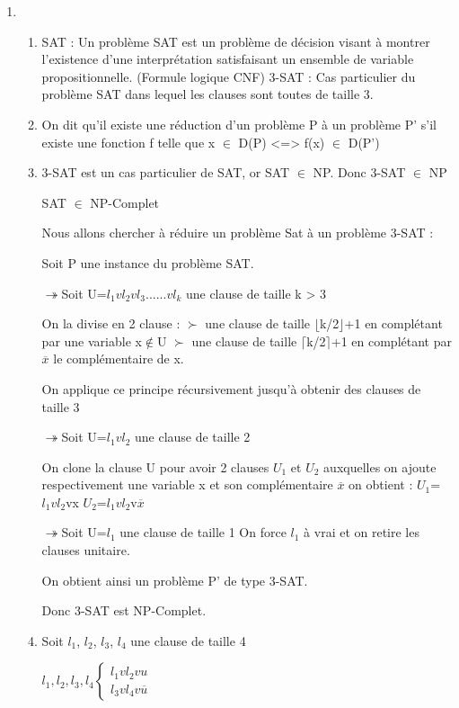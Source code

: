 \documentclass{article}
\begin{document}
\begin{enumerate}
\item \begin{enumerate}
  \item
    SAT : Un  problème SAT est un problème de décision visant à montrer l'existence d'une interprétation satisfaisant un ensemble de variable propositionnelle. (Formule logique CNF)
    3-SAT : Cas particulier du problème SAT dans lequel les clauses sont toutes de taille 3.

  \item
    On dit qu'il existe une réduction d'un problème P à un problème P' s'il existe une fonction f telle que x $\in$ D(P) <=> f(x) $\in$ D(P')

  \item
    3-SAT est un cas particulier de SAT, or SAT $\in$ NP.
    Donc 3-SAT $\in$ NP

    SAT $\in$ NP-Complet

    Nous allons chercher à réduire un problème Sat à un problème 3-SAT : 

    Soit P une instance du problème SAT.
    
    $\twoheadrightarrow$Soit U={$l_1vl_2vl_3......vl_k$} une clause de taille k > 3

    On la divise en 2 clause :
    $\succ$ une clause de taille $\lfloor$k/2$\rfloor$+1 en complétant par une variable x$\notin$U 
    $\succ$ une clause de taille $\lceil$k/2$\rceil$+1 en complétant par $\overline x$ le complémentaire de x.

    On applique ce principe récursivement jusqu'à obtenir des clauses de taille 3

    $\twoheadrightarrow$Soit U={$l_1vl_2$} une clause de taille 2
    
    On clone la clause U pour avoir 2 clauses $U_1$ et $U_2$ auxquelles on ajoute respectivement une variable x et son complémentaire $\overline x$
    on obtient :  $U_1$={$l_1vl_2$vx}
    $U_2$={$l_1vl_2$v$\overline x$}

    $\twoheadrightarrow$Soit U={$l_1$} une clause de taille 1
    On force $l_1$ à vrai et on retire les clauses unitaire.

    On obtient ainsi un problème P' de type 3-SAT.    

    Donc 3-SAT est NP-Complet.

    \item
      Soit $l_1$, $l_2$, $l_3$, $l_4$ une clause de taille 4

      $l_1, l_2, l_3, l_4\left\lbrace 
      \begin{array}{lcl} 
        l_1 v l_2 v u\\
        l_3 v l_4 v \overline u
      \end{array}\right.$
    
\end{enumerate}
\end{enumerate}
\end{document}

